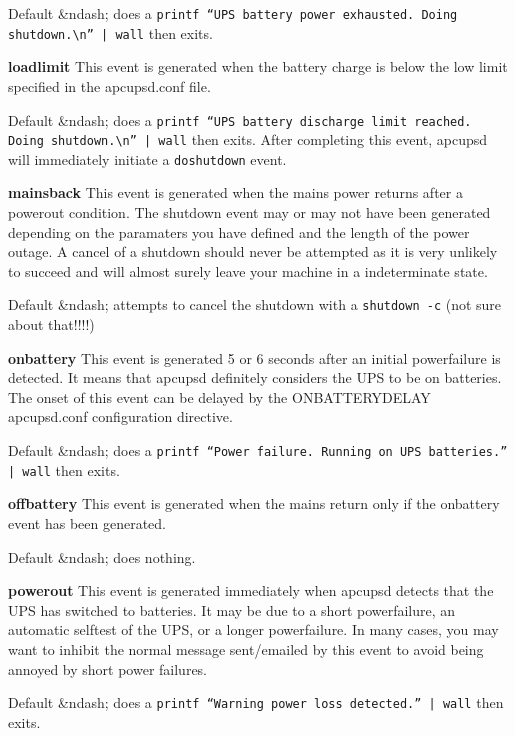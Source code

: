 \begin{description}
Default \&ndash; does a {\tt printf ``UPS battery power exhausted. Doing
shutdown.\textbackslash{}n'' | wall} then exits.  

\item {\bf loadlimit}
This event is generated when the battery charge is below the low limit
specified in the apcupsd.conf file.  

Default \&ndash; does a {\tt printf ``UPS battery discharge limit reached.
Doing shutdown.\textbackslash{}n'' | wall} then exits.  After completing this
event, apcupsd will immediately initiate a {\tt doshutdown} event.  

\item {\bf mainsback}
This event is generated when the mains power returns after a powerout
condition. The shutdown event may or may not have been generated depending on
the paramaters you have defined and the length of the power outage. A cancel
of a shutdown should never be attempted as it is very unlikely to succeed and
will almost surely leave your machine in a indeterminate state.  

Default \&ndash; attempts to cancel the shutdown with a {\tt shutdown -c} (not
sure about that!!!!)  

\item {\bf onbattery}
This event is generated 5 or 6 seconds after an initial powerfailure is
detected. It means that apcupsd definitely considers the UPS to be on
batteries. The onset of this event can be delayed by the ONBATTERYDELAY
apcupsd.conf configuration directive.  

Default \&ndash; does a {\tt printf ``Power failure. Running on UPS
batteries.'' | wall} then exits.  

\item {\bf offbattery}
This event is generated when the mains return only if the onbattery event has
been generated.  

Default \&ndash; does nothing.  

\item {\bf powerout}
This event is generated immediately when apcupsd detects that the UPS has
switched to batteries. It may be due to a short powerfailure, an automatic
selftest of the UPS, or a longer powerfailure. In many cases, you may want to
inhibit the normal message sent/emailed by this event to avoid being annoyed
by short power failures.  

Default \&ndash; does a {\tt printf ``Warning power loss detected.'' | wall}
then exits.  


\end{description}
